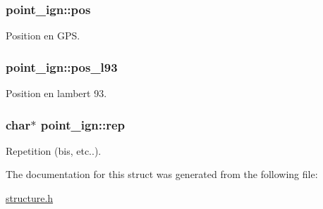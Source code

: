 \subsubsection[{\texorpdfstring{pos}{pos}}]{ point\+\_\+ign\+::pos}\hypertarget{structpoint__ign_a34c5f3410fedaa7abc87cbb37914f313}{}\label{structpoint__ign_a34c5f3410fedaa7abc87cbb37914f313}
Position en G\+PS. 
\subsubsection[{\texorpdfstring{pos\+\_\+l93}{pos_l93}}]{ point\+\_\+ign\+::pos\+\_\+l93}\hypertarget{structpoint__ign_af56717fd3b1fefefe988272eab34b0a0}{}\label{structpoint__ign_af56717fd3b1fefefe988272eab34b0a0}
Position en lambert 93. 
\subsubsection[{\texorpdfstring{rep}{rep}}]{\setlength{\rightskip}{0pt plus 5cm}char$\ast$ point\+\_\+ign\+::rep}\hypertarget{structpoint__ign_a2774caa7344e2586bd20a91a9c1fc0be}{}\label{structpoint__ign_a2774caa7344e2586bd20a91a9c1fc0be}
Repetition (bis, etc..). 

The documentation for this struct was generated from the following file\+:\begin{DoxyCompactItemize}
\item 
\hyperlink{structure_8h}{structure.\+h}\end{DoxyCompactItemize}
